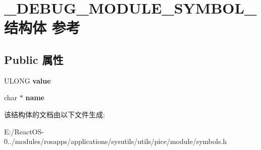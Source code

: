\hypertarget{struct___d_e_b_u_g___m_o_d_u_l_e___s_y_m_b_o_l__}{}\section{\+\_\+\+D\+E\+B\+U\+G\+\_\+\+M\+O\+D\+U\+L\+E\+\_\+\+S\+Y\+M\+B\+O\+L\+\_\+结构体 参考}
\label{struct___d_e_b_u_g___m_o_d_u_l_e___s_y_m_b_o_l__}
\subsection*{Public 属性}
\begin{DoxyCompactItemize}
\item 
\mbox{\label{struct___d_e_b_u_g___m_o_d_u_l_e___s_y_m_b_o_l___a061757fbf0245e791db72a48b689e9dd}} 
U\+L\+O\+NG {\bfseries value}
\item 
\mbox{\label{struct___d_e_b_u_g___m_o_d_u_l_e___s_y_m_b_o_l___a584c0e0181ffdf4ca4e465508194f88e}} 
char $\ast$ {\bfseries name}
\end{DoxyCompactItemize}


该结构体的文档由以下文件生成\+:\begin{DoxyCompactItemize}
\item 
E\+:/\+React\+O\+S-\/0../modules/rosapps/applications/sysutils/utils/pice/module/symbols.\+h\end{DoxyCompactItemize}

